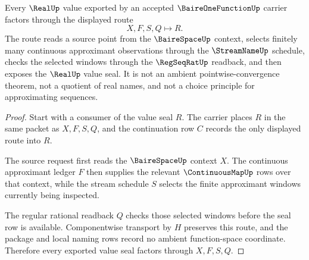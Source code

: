 \begin{theorem}
\label{thm:baireonefunction-pointwise-limit-ledger}
\label{thm:baire-one-function-pointwise-limit-handoff}
Every $\RealUp$ value exported by an accepted $\BaireOneFunctionUp$ carrier factors through the displayed route
$$
X,F,S,Q \longmapsto R .
$$
The route reads a source point from the $\BaireSpaceUp$ context, selects finitely many continuous approximant observations through the $\StreamNameUp$ schedule, checks the selected windows through the $\RegSeqRatUp$ readback, and then exposes the $\RealUp$ value seal. It is not an ambient pointwise-convergence theorem, not a quotient of real names, and not a choice principle for approximating sequences.
\end{theorem}
\begin{proof}
Start with a consumer of the value seal $R$. The carrier places $R$ in the same packet as $X,F,S,Q$, and the continuation row $C$ records the only displayed route into $R$.

The source request first reads the $\BaireSpaceUp$ context $X$. The continuous approximant ledger $F$ then supplies the relevant $\ContinuousMapUp$ rows over that context, while the stream schedule $S$ selects the finite approximant windows currently being inspected.

The regular rational readback $Q$ checks those selected windows before the seal row is available. Componentwise transport by $H$ preserves this route, and the package and local naming rows record no ambient function-space coordinate. Therefore every exported value seal factors through $X,F,S,Q$.
\end{proof}


